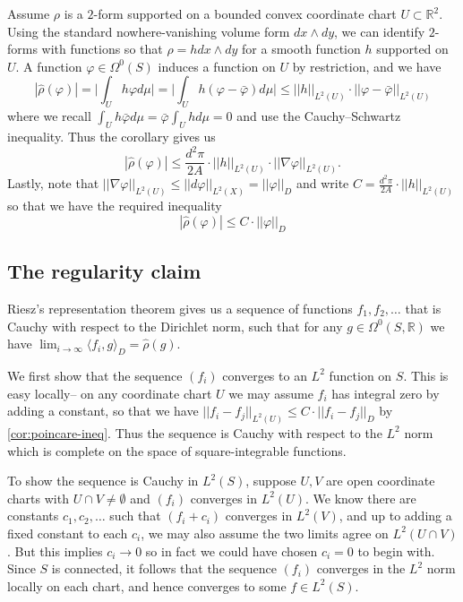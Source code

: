 Assume \(\rho\) is a \(2\)-form supported on a bounded convex coordinate chart
\(U\subset \mathbb{R}^2\). Using the standard nowhere-vanishing volume form
\(dx\wedge dy\), we can identify \(2\)-forms with functions so that
\(\rho=hdx\wedge dy\) for a smooth function \(h\) supported on \(U\). A function \(\varphi \in \Omega^0(S)\) induces a function
on \(U\) by restriction, and we have
\[
    |\hat\rho(\varphi)|
    = \bigg\vert \int_U h\varphi d\mu \bigg\vert
    = \bigg\vert \int_U h(\varphi -\bar \varphi) d\mu \bigg\vert
    \leq ||h||_{L^2(U)} \cdot ||\varphi-\bar\varphi||_{L^2(U)}
\]
where we recall \(\int_U h\bar\varphi d\mu = \bar\varphi \int_U hd\mu = 0\) and
use the Cauchy--Schwartz inequality. Thus the corollary gives us
\[|\hat\rho(\varphi)|\leq \frac{d^2\pi}{2 A} \cdot ||h||_{L^2(U)}\cdot ||\nabla
\varphi||_{L^2(U)}.\] Lastly, note that
\(||\nabla \varphi||_{L^2(U)}\leq ||d\varphi||_{L^2(X)}=||\varphi||_D\) and
write \(C=\frac{d^2\pi}{2 A}\cdot ||h||_{L^2(U)}\)  so that we have the required
inequality
\[
    |\hat\rho(\varphi)|\leq C\cdot ||\varphi||_D
\]

\subsection{The regularity claim} Riesz's representation theorem gives us a
sequence of functions \(f_1,f_2,\ldots\) that is Cauchy with respect to the
Dirichlet norm, such that for any \(g\in \Omega^0(S,\mathbb{R})\) we have
\(\lim_{i\to \infty}\langle f_i,g\rangle_D= \hat\rho(g)\).

We first show that the sequence \((f_i)\) converges to an \(L^2\) function on
\(S\). This is easy locally-- on any coordinate chart \(U\) we may assume
\(f_i\) has integral zero by adding a constant, so that we have
\(||f_i-f_j||_{L^2(U)}\leq C\cdot ||f_i-f_j||_D\) by \cref{cor:poincare-ineq}.
Thus the sequence is Cauchy with respect to the \(L^2\) norm which is complete
on the space of square-integrable functions.

To show the sequence is Cauchy in \(L^2(S)\), suppose \(U,V\) are open
coordinate charts with \(U\cap V\neq \emptyset\) and \((f_i)\) converges in
\(L^2(U)\). We know there are
constants \(c_1,c_2,\ldots\) such that \((f_i+c_i)\) converges
in \(L^2(V)\), and up to adding a fixed constant to each \(c_i\), we may also
assume the two limits agree on \(L^2(U\cap V)\). But this implies \(c_i\rightarrow 0\) so in fact we could have
chosen \(c_i=0\) to begin with. Since \(S\) is connected, it follows that the
sequence \((f_i)\) converges in the \(L^2\) norm locally on each chart, and
hence converges to some \(f\in L^2(S)\).

